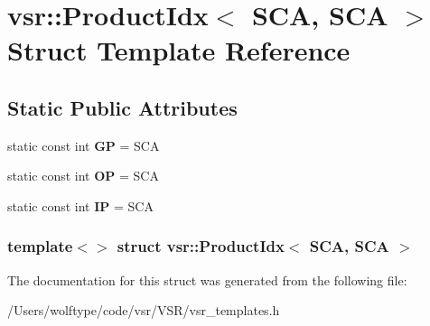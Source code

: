 \hypertarget{structvsr_1_1_product_idx_3_01_s_c_a_00_01_s_c_a_01_4}{\section{vsr\-:\-:Product\-Idx$<$ S\-C\-A, S\-C\-A $>$ Struct Template Reference}
\label{structvsr_1_1_product_idx_3_01_s_c_a_00_01_s_c_a_01_4}
}
\subsection*{Static Public Attributes}
\begin{DoxyCompactItemize}
\item 
\hypertarget{structvsr_1_1_product_idx_3_01_s_c_a_00_01_s_c_a_01_4_a7c93f12d085b543ecac56e3e9d662438}{static const int {\bfseries G\-P} = S\-C\-A}\label{structvsr_1_1_product_idx_3_01_s_c_a_00_01_s_c_a_01_4_a7c93f12d085b543ecac56e3e9d662438}

\item 
\hypertarget{structvsr_1_1_product_idx_3_01_s_c_a_00_01_s_c_a_01_4_afb4161e24d194202de86aeb705c6b031}{static const int {\bfseries O\-P} = S\-C\-A}\label{structvsr_1_1_product_idx_3_01_s_c_a_00_01_s_c_a_01_4_afb4161e24d194202de86aeb705c6b031}

\item 
\hypertarget{structvsr_1_1_product_idx_3_01_s_c_a_00_01_s_c_a_01_4_ab6ec521e7f132408b2f382f89aad5e70}{static const int {\bfseries I\-P} = S\-C\-A}\label{structvsr_1_1_product_idx_3_01_s_c_a_00_01_s_c_a_01_4_ab6ec521e7f132408b2f382f89aad5e70}

\end{DoxyCompactItemize}
\subsubsection*{template$<$$>$ struct vsr\-::\-Product\-Idx$<$ S\-C\-A, S\-C\-A $>$}



The documentation for this struct was generated from the following file\-:\begin{DoxyCompactItemize}
\item 
/\-Users/wolftype/code/vsr/\-V\-S\-R/vsr\-\_\-templates.\-h\end{DoxyCompactItemize}
